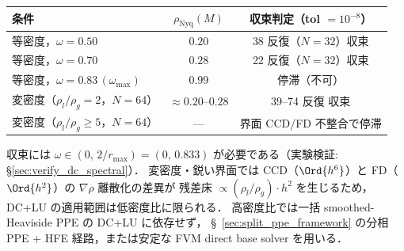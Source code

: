 \begin{tcolorbox}[resultbox, title={欠陥補正法の収束特性まとめ（DC + 直接 LU，Step 2 = \texttt{spsolve}）}]
\begin{center}
\PaperTableSetup
\begin{tabular}{lcc}
\toprule
条件 & $\rho_{\mathrm{Nyq}}(M)$ & 収束判定（tol $= 10^{-8}$） \\
\midrule
等密度，$\omega = 0.50$ & $0.20$ & 38 反復（$N=32$）収束 \\
等密度，$\omega = 0.70$ & $0.28$ & 22 反復（$N=32$）収束 \\
等密度，$\omega = 0.83\,(\omega_{\max})$ & $0.99$ & 停滞（不可） \\
変密度（$\rho_l/\rho_g = 2$，$N=64$） & $\approx 0.20$--$0.28$ & 39--74 反復 収束 \\
変密度（$\rho_l/\rho_g \ge 5$，$N=64$） & — & 界面 CCD/FD 不整合で停滞 \\
\bottomrule
\end{tabular}
\end{center}
収束には $\omega \in (0,\, 2/r_{\max}) = (0,\, 0.833)$ が必要である（実験検証: §\ref{sec:verify_dc_spectral}）．
変密度・鋭い界面では CCD（$\Ord{h^6}$）と FD（$\Ord{h^2}$）の $\nabla\rho$ 離散化の差異が
残差床 $\propto (\rho_l/\rho_g) \cdot h^2$ を生じるため，DC+LU の適用範囲は低密度比に限られる．
高密度比では一括 smoothed-Heaviside PPE の DC+LU に依存せず，
§~\ref{sec:split_ppe_framework} の分相 PPE + HFE 経路，または安定な FVM direct base solver を用いる．
\end{tcolorbox}
